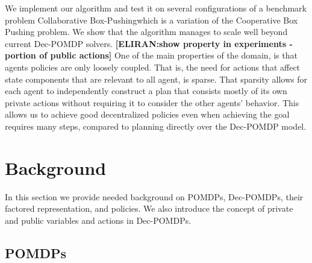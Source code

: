 \documentclass[letterpaper]{article} %
\newcommand{\eliran}[1]{\textbf{[\color{red}ELIRAN:#1]}}
\newcommand{\cbp}[0]{Collaborative Box-Pushing}
\begin{document}
We implement our algorithm and test it on several configurations of a benchmark problem \cbp which is a variation of the Cooperative Box Pushing problem. We show that the algorithm manages to scale well beyond
current Dec-POMDP solvers. \eliran{show property in experiments - portion of public actions}
One of the main properties of the domain, is that agents policies are only loosely coupled. That is, the need for actions that affect state components that are relevant to all agent, is sparse. That sparsity allows for each agent to independently construct a plan that consists mostly of its own private actions without requiring it to consider the other agents' behavior. This allows us to achieve good decentralized policies even when achieving the goal requires many steps, compared to planning directly over the Dec-POMDP model.

\section{Background}

In this section we provide needed background on POMDPs, Dec-POMDPs, their factored representation,
and policies. We also introduce the concept of private and public variables and actions in Dec-POMDPs.

\subsection{POMDPs}
\end{document}
